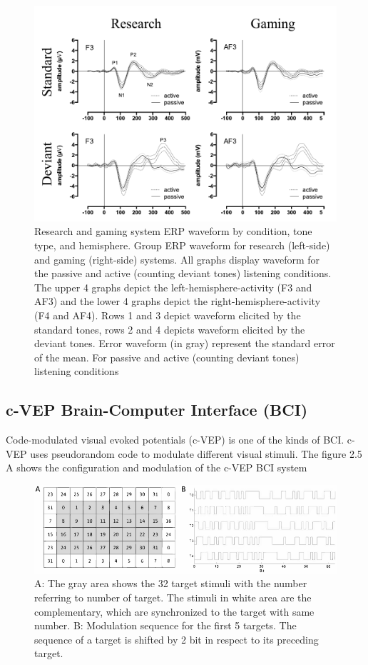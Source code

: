 \begin{figure}[ht]
	\centering
  	\includegraphics[scale = 0.75]{chapter2/24.pdf}
  	\caption{Research and gaming system ERP waveform by condition, tone type, and hemisphere. Group ERP waveform for research (left-side) and gaming (right-side) systems. All graphs display waveform for the passive and active (counting deviant tones) listening conditions. The upper 4 graphs depict the left-hemisphere-activity (F3 and AF3) and the lower 4 graphs depict the right-hemisphere-activity (F4 and AF4). Rows 1 and 3 depict waveform elicited by the standard tones, rows 2 and 4 depicts waveform elicited by the deviant tones. Error waveform (in gray) represent the standard error of the mean. For  passive and active (counting deviant tones) listening conditions}
\end{figure}
\newpage

\subsection {c-VEP Brain-Computer Interface (BCI)\cite{ref5}}

\hspace{1.5cm} Code-modulated visual evoked potentials (c-VEP) is one of the kinds of BCI. c-VEP uses pseudorandom code to modulate different visual stimuli. The figure 2.5 A shows the configuration and modulation of the c-VEP BCI system

\begin{figure}[ht]
	\centering
  	\includegraphics[scale = 1]{chapter2/25.pdf}
  	\caption{A: The gray area shows the 32 target stimuli with the number referring to number of  target. The stimuli in white area are the complementary, which are synchronized to the target with same number. B: Modulation sequence for the first 5 targets. The sequence of a target is shifted by 2 bit in respect to its preceding target.}
\end{figure}

